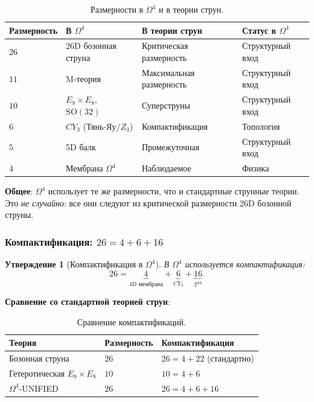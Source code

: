 \documentclass[11pt,a4paper]{article}
\newcommand{\SO}{\ensuremath{\mathrm{SO}}}
\newcommand{\CY}{\ensuremath{CY_3}}
\newcommand{\Om}{\ensuremath{\Omega^4}}
\newtheorem{proposition}[theorem]{Утверждение}
\theoremstyle{definition}
\begin{document}
\begin{table}[ht]
\centering
\small
\caption{Размерности в \texorpdfstring{$\Om$}{} и в теории струн.}
\label{tab:string-dimensions}
\begin{tabular}{@{}p{1.5cm} p{3cm} p{4.5cm} p{2.5cm}@{}}
\toprule
Размерность & В $\Om$ & В теории струн & Статус в $\Om$ \\
\midrule
$26$ & 26D бозонная струна & Критическая размерность & Структурный вход \\
$11$ & M-теория & Максимальная размерность & Структурный вход \\
$10$ & $E_8 \times E_8$, $\SO(32)$ & Суперструны & Структурный вход \\
$6$  & $\CY$ (Тянь-Яу$/Z_3$) & Компактификация & Топология \\
$5$  & 5D балк & Промежуточная & Структурный вход \\
$4$  & Мембрана $\Om$ & Наблюдаемое & Физика \\
\bottomrule
\end{tabular}
\end{table}

\medskip\noindent
\textbf{Общее}: $\Om$ использует те же размерности, что
и стандартные струнные теории. Это \emph{не случайно}:
все они следуют из критической размерности 26D бозонной струны.

\subsubsection{Компактификация: \texorpdfstring{$26 = 4 + 6 + 16$}{26 = 4 + 6 + 16}}

\begin{proposition}[Компактификация в $\Om$]
\label{prop:string-compactification}
В $\Om$ используется компактификация:
\begin{equation}
    \boxed{
    26 = \underbrace{4}_{\text{4D мембрана}} + \underbrace{6}_{\CY} + \underbrace{16}_{T^{16}}.
    }
    \label{eq:string-compact-26}
\end{equation}
\end{proposition}

\medskip\noindent
\textbf{Сравнение со стандартной теорией струн}:
\begin{table}[ht]
\centering
\caption{Сравнение компактификаций.}
\label{tab:string-compact-comparison}
\begin{tabular}{lll}
\toprule
Теория & Размерность & Компактификация \\
\midrule
Бозонная струна & $26$ & $26 = 4 + 22$ (стандартно) \\
Гетеротическая $E_8 \times E_8$ & $10$ & $10 = 4 + 6$ \\
$\Om$-UNIFIED & $26$ & $26 = 4 + 6 + 16$ \\
\bottomrule
\end{tabular}
\end{table}
\end{document}
